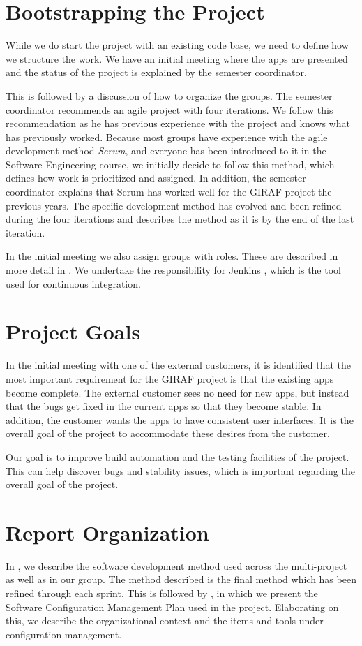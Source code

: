 \section{Bootstrapping the Project}
While we do start the project with an existing code base, we need to define how we structure the work. We have an initial meeting where the apps are presented and the status of the project is explained by the semester coordinator.

This is followed by a discussion of how to organize the groups. The semester coordinator recommends an agile project with four iterations. We follow this recommendation as he has previous experience with the project and knows what has previously worked. Because most groups have experience with the agile development method \emph{Scrum}, and everyone has been introduced to it in the Software Engineering course, we initially decide to follow this method, which defines how work is prioritized and assigned. In addition, the semester coordinator explains that Scrum has worked well for the GIRAF project the previous years. The specific development method has evolved and been refined during the four iterations and  describes the method as it is by the end of the last iteration.

In the initial meeting we also assign groups with roles. These are described in more detail in . We undertake the responsibility for Jenkins \cite{JenkinsWebsite}, which is the tool used for continuous integration.

\section{Project Goals}
In the initial meeting with one of the external customers, it is identified that the most important requirement for the GIRAF project is that the existing apps become complete. The external customer sees no need for new apps, but instead that the bugs get fixed in the current apps so that they become stable. In addition, the customer wants the apps to have consistent user interfaces. It is the overall goal of the project to accommodate these desires from the customer.

Our goal is to improve build automation and the testing facilities of the project. This can help discover bugs and stability issues, which is important regarding the overall goal of the project.

\section{Report Organization}
In , we describe the software development method used across the multi-project as well as in our group. The method described is the final method which has been refined through each sprint. This is followed by , in which we present the Software Configuration Management Plan used in the project. Elaborating on this, we describe the organizational context and the items and tools under configuration management.

